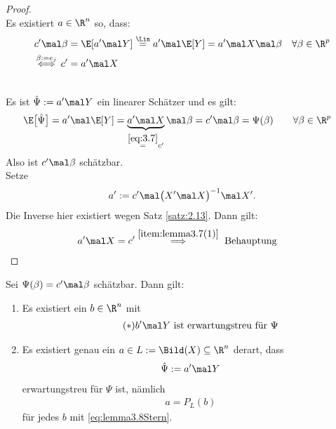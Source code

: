 \begin{proof}
	\\
	Es existiert $a\in\R^n$ so, dass:
	\begin{align*}
		c'\mal\beta
		&=\E[a'\mal Y]
		\overset{\Lin}{=}
		a'\mal\E[Y]
		=a'\mal X\mal\beta &&\forall\beta\in\R^p\\
		\overset{\beta:=e_j}{\iff}
		c'&=a'\mal X
	\end{align*}		
	
	\\
	Es ist $\hat{\Psi}:=a'\mal Y$ ein linearer Schätzer und es gilt:
	\begin{align*}
		\E\big[\hat{\Psi}\big]
		&=a'\mal\E[Y]
		=\underbrace{a'\mal X}_{
			\overset{\eqref{eq:3.7}}{=}c'		
		}\mal\beta
		=c'\mal\beta
		=\Psi(\beta)
		\qquad\forall \beta\in\R^p
	\end{align*}
	Also ist $c'\mal\beta$ schätzbar.\nl
	\\
	Setze
	\begin{align*}
		a':=c'\mal\big(X'\mal X\big)^{-1}\mal X'.
	\end{align*}
	Die Inverse hier existiert wegen Satz \ref{satz:2.13}.
	Dann gilt:
	\begin{align*}
		a'\mal X
		&=c'
		\overset{\ref{item:lemma3.7(1)}}{\implies}\text{ Behauptung}
	\end{align*}
\end{proof}

\begin{lemma}\label{lemma3.8}
	Sei $\Psi(\beta)=c'\mal\beta$ schätzbar.
	Dann gilt:
	\begin{enumerate}[label=(\arabic*)]
		\item Es existiert ein $b\in\R^n$ mit
		\begin{align}\label{eq:lemma3.8Stern}\tag{$*$}
			b'\mal Y\text{ ist erwartungstreu für }\Psi
		\end{align}
		\label{item:lemma3.8(1)}
		\item Es existiert genau ein $a\in L:=\Bild(X)\subseteq\R^n$ derart, dass
		\label{item:lemma3.8(2)}
		\begin{align*}
			\hat{\Psi}:=a'\mal Y
		\end{align*}
		erwartungstreu für $\Psi$ ist, nämlich
		\begin{align*}
			a=P_L(b)
		\end{align*}
		für jedes $b$ mit \eqref{eq:lemma3.8Stern}.
	\end{enumerate}
\end{lemma}

